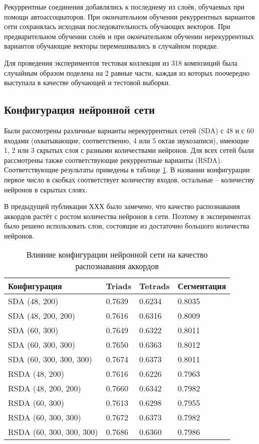 Рекуррентные соединения добавлялись к последнему из слоёв, обучаемых при помощи
автоассоциаторов. При окончательном обучении рекуррентных вариантов сети
сохранялась исходная последовательность обучающих векторов. При предварительном
обучении слоёв и при окончательном обучении нерекуррентных вариантов обучающие
векторы перемешивались в случайном порядке.

Для проведения экспериментов тестовая коллекция из 318 композиций была случайным
образом поделена на 2 равные части, каждая из которых поочередно выступала в
качестве обучающей и тестовой выборки.

\subsection{Конфигурация нейронной сети}

Были рассмотрены различные варианты нерекуррентных сетей (SDA) с 48 и с 60
входами (охватывающие, соответственно, 4 или 5 октав звукозаписи), имеющие 1, 2
или 3 скрытых слоя с разными количествами нейронов. Для всех сетей были
рассмотрены также соответствующие рекуррентные варианты (RSDA). Соответствующие
результаты приведены в таблице \ref{Tnnconf}. В названии конфигурации первое
число в скобках соответствует количеству входов, остальные -- количеству
нейронов в скрытых слоях.

В предыдущей публикации ХХХ было замечено, что качество распознавания аккордов
растёт с ростом количества нейронов в сети. Поэтому в экспериментах было решено
использовать слои, состоящие из достаточно большого количества нейронов.

\begin{table} [htbp]
  \centering
  \parbox{15cm}{\caption{Влияние конфигурации нейронной сети на качество
  распознавания аккордов} \label{Tnnconf}}
  \begin{tabular}{|l|l|l|l|}
  \hline
  Конфигурация & Triads & Tetrads & Сегментация \\
  \hline
  SDA (48, 200) & 0.7639 & 0.6234 & 0.8035 \\
  SDA (48, 200, 200) & 0.7616 & 0.6316 & 0.8009 \\
  SDA (60, 300) & 0.7649 & 0.6322 & 0.8011 \\
  SDA (60, 300, 300) & 0.7650 & 0.6363 & 0.8012 \\
  SDA (60, 300, 300, 300) & 0.7674 & 0.6373 & 0.8011 \\
  \hline
  RSDA (48, 200) & 0.7616 & 0.6226 & 0.7963 \\
  RSDA (48, 200, 200) & 0.7660 & 0.6342 & 0.7982 \\
  RSDA (60, 300) & 0.7613 & 0.6298 & 0.7955 \\
  RSDA (60, 300, 300) & 0.7672 & 0.6373 & 0.7982 \\
  RSDA (60, 300, 300, 300) & 0.7686 & 0.6360 & 0.7986 \\
  \hline
  \end{tabular}
\end{table}

